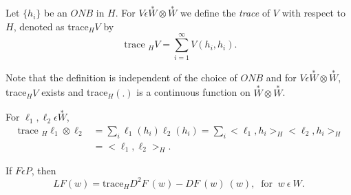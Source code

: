 \begin{definition}\label{chap1:def1.8}\pageoriginale%
Let $\{h_i\}$ be an $ONB$ in $H$. For $V \epsilon  \overset{\ast}{W}
\otimes \overset{\ast}{W}$ 
we define the \textit{trace} of $V$ with respect to $H$, denoted as
trace$_HV$ by 
$$
\text{ trace }_HV = \sum^{\infty}_{i = 1} V(h_i, h_i).
$$
\end{definition}

Note that the definition is independent of the choice of $ONB$ and for 
$V \epsilon  \overset{\ast}{W} \otimes \overset{\ast}{W}$, trace$_HV$
exists and trace$_H(.)$ is 
a continuous function on $\overset{\ast}{W} \otimes
\overset{\ast}{W}$. 

\begin{remark*}
  For $\ell_1, \ell_2 \epsilon  \overset{\ast}{W}$,
  \begin{align*}
    \text { trace }_H \ell_1 \otimes \ell_2 & = \sum_{i} \ell_1 (h_i)
    \ell_2 (h_i) = \sum_{i} < \ell_1, h_i > _H < \ell_2, h_i > _H\\ 
    & = < \ell_1, \ell_2 >  _H.
  \end{align*}
\end{remark*}

\begin{theorem}%
  If $F \epsilon  P$, then
  \begin{equation*}
    LF (w) = \text {trace}_H D^2 F~(w) - DF~ (w)~ (w),~ \text{ for } ~w
    ~\epsilon  ~W. \tag{1.3}\label{thmeq1.3}  
  \end{equation*}
\end{theorem}


